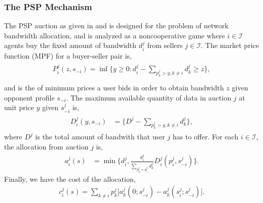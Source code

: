 \documentclass[12pt]{article}
\theoremstyle{definition}
\newcommand{\mcI}{\mathcal{I}}
\begin{document}
\begin{multicols}{2}
\subsubsection{The PSP Mechanism}\label{mechanism}
The PSP auction as given in \cite{lazar} and \cite{semret} is designed for the
problem of network bandwidth allocation, and is analyzed as a noncooperative
game where $i\in\mcI$ agents buy the
fixed amount of bandwidth $d_i^j$ from sellers $j\in\mcI$.
The market price function (MPF) for a buyer-seller pair is,
\begin{align}\label{dataprice}
\begin{split}
    P_i^j(z, s_{-i})= \inf\bigg\lbrace y\ge 0 : 
    d_i^j - \sum_{p_k^j>y,k\ne i} d_k^j \ge z \bigg\rbrace,\\
\end{split}
\end{align}
and is the of minimum prices a user bids in
order to obtain bandwidth $z$ given opponent profile $s_{-i}$. 
The maximum available quantity of data in auction
$j$ at unit price $y$ given $s_{-i}^j$ is,
\begin{align}\label{datapriceinverse}
\begin{split}
    D_i^j(y, s_{-i}) &= \bigg\lbrace D^j - \sum_{p_k^j>y,k\ne i} d_k^j  \bigg\rbrace,
\end{split}
\end{align}
where $D^j$ is the total amount of bandwith that user $j$ has to offer.
For each $i \in \mcI$, the allocation from auction $j$ is,
\begin{align}\label{dataallocation}
    a_i^j(s) &= \min\bigg\lbrace d_i^j, 
    \frac{d_i^j}{\sum_{p_k^j= p_i^j}d_k^j} D_i^j(p_i^j,s_{-i}^j)\bigg\rbrace.
\end{align}
Finally, we have the cost of the allocation,
\begin{align}\label{datacost}
    c_i^j(s) = \displaystyle\sum_{k\ne i} 
p_k^j \big[a_k^j(0; s_{-i}^j)
    -a_k^j(s_i^j;s_{-i}^j)\big].
\end{align}


\end{multicols}
\end{document}
